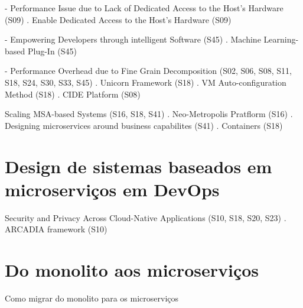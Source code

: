     - Performance Issue due to Lack of Dedicated Access to the Host's Hardware (S09)
        . Enable Dedicated Access to the Host's Hardware (S09)

    - Empowering Developers through intelligent Software (S45)
        . Machine Learning-based Plug-In (S45)

    - Performance Overhead due to Fine Grain Decomposition (S02, S06, S08, S11, S18, S24, S30, S33, S45)
        . Unicorn Framework (S18)
        . VM Auto-configuration Method (S18)
        . CIDE Platform (S08)

    Scaling MSA-based Systems (S16, S18, S41)
        . Neo-Metropolis Pratflorm (S16)
        . Designing microservices around business capabilites (S41)
        . Containers (S18)

\section{Design de sistemas baseados em microserviços em DevOps}

Security and Privacy Across Cloud-Native Applications (S10, S18, S20, S23)
    . ARCADIA framework (S10)

\section{Do monolito aos microserviços}

Como migrar do monolito para os microserviços